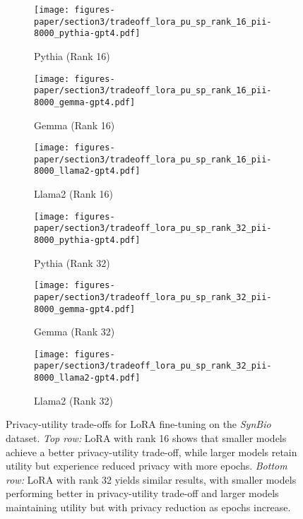 \begin{figure*}[ht!]
    \centering
    \begin{subfigure}{0.3\textwidth}
        \centering
        \texttt{[image: figures-paper/section3/tradeoff\_lora\_pu\_sp\_rank\_16\_pii-8000\_pythia-gpt4.pdf]}
        \caption{Pythia (Rank 16)}
        \label{fig:lora_16_piia}
    \end{subfigure}
    \begin{subfigure}{0.3\textwidth}
        \centering
        \texttt{[image: figures-paper/section3/tradeoff\_lora\_pu\_sp\_rank\_16\_pii-8000\_gemma-gpt4.pdf]}
        \caption{Gemma (Rank 16)}
        \label{fig:lora_16_piib}
    \end{subfigure}
    \begin{subfigure}{0.3\textwidth}
        \centering
        \texttt{[image: figures-paper/section3/tradeoff\_lora\_pu\_sp\_rank\_16\_pii-8000\_llama2-gpt4.pdf]}
        \caption{Llama2 (Rank 16)}
        \label{fig:lora_16_piic}
    \end{subfigure}

    \begin{subfigure}{0.3\textwidth}
        \centering
        \texttt{[image: figures-paper/section3/tradeoff\_lora\_pu\_sp\_rank\_32\_pii-8000\_pythia-gpt4.pdf]}
        \caption{Pythia (Rank 32)}
        \label{fig:lora_32_piia}
    \end{subfigure}
    \begin{subfigure}{0.3\textwidth}
        \centering
        \texttt{[image: figures-paper/section3/tradeoff\_lora\_pu\_sp\_rank\_32\_pii-8000\_gemma-gpt4.pdf]}
        \caption{Gemma (Rank 32)}
        \label{fig:lora_32_piib}
    \end{subfigure}    
    \begin{subfigure}{0.3\textwidth}
        \centering
        \texttt{[image: figures-paper/section3/tradeoff\_lora\_pu\_sp\_rank\_32\_pii-8000\_llama2-gpt4.pdf]}
        \caption{Llama2 (Rank 32)}
        \label{fig:lora_32_piic}
    \end{subfigure}

    \caption{
        Privacy-utility trade-offs for LoRA fine-tuning on the \emph{SynBio} dataset. \emph{Top row:} LoRA with rank 16 shows that smaller models achieve a better privacy-utility trade-off, while larger models retain utility but experience reduced privacy with more epochs. \emph{Bottom row:} LoRA with rank 32 yields similar results, with smaller models performing better in privacy-utility trade-off and larger models maintaining utility but with privacy reduction as epochs increase.
    }
    \label{fig:combined_lora_synbio}
\end{figure*}


